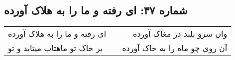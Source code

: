 \begin{center}
\section*{شماره ۳۷: ای رفته و ما را به هلاک آورده}
\label{sec:037}
\begin{longtable}{l p{0.5cm} r}
ای رفته و ما را به هلاک آورده
&&
وان سرو بلند در مغاک آورده
\\
بر خاک تو ماهتاب میتابد و تو
&&
آن روی چو ماه را به خاک آورده
\\
\end{longtable}
\end{center}
